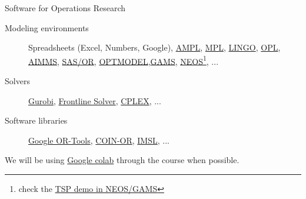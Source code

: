 \documentclass[c]{beamer}
\begin{document}
\begin{frame}{Software for Operations Research}
 \begin{description}
   \item[Modeling environments] Spreadsheets (Excel, Numbers, Google), \href{https://ampl.com}{AMPL}, \href{http://www.maximalsoftware.com/mpl/}{MPL}, \href{https://www.lindo.com/index.php/products/lingo-and-optimization-modeling}{LINGO}, \href{https://www.ibm.com/docs/en/icos/12.9.0?topic=opl-optimization-programming-language}{OPL}, \href{https://www.aimms.com}{AIMMS}, \href{https://www.sas.com/es_es/software/or.html}{SAS/OR}, \href{https://support.sas.com/rnd/app/or/procedures/optmodel.html}{OPTMODEL},\href{https://www.gams.com}{GAMS}, \href{https://neos-guide.org}{NEOS}\footnote{check the \href{https://neos-guide.org/content/or}{TSP demo in NEOS/GAMS}}, ...
   \item[Solvers] \href{https://www.gurobi.com}{Gurobi},
   \href{https://www.solver.com}{Frontline Solver},
   \href{https://www.ibm.com/products/ilog-cplex-optimization-studio}{CPLEX}, ...
   \item[Software libraries] \href{https://developers.google.com/optimization}{Google OR-Tools}, \href{https://www.coin-or.org}{COIN-OR}, \href{https://www.imsl.com}{IMSL}, ...
 \end{description}
 We will be using \href{https://github.com/JordiVillaFreixa/ORcode}{Google colab} through the course when possible.
\end{frame}



\end{document}

